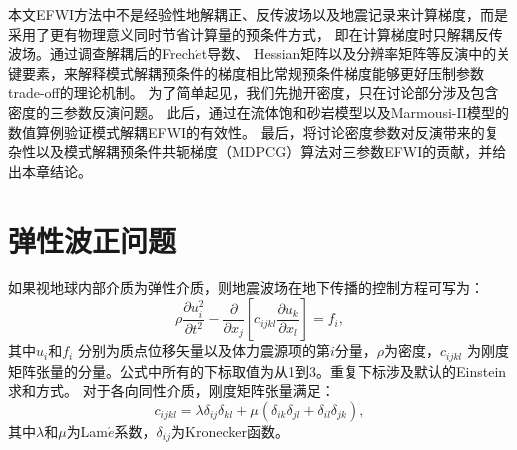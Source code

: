 本文EFWI方法中不是经验性地解耦正、反传波场以及地震记录\cite{ren.liu:2016}来计算梯度，而是采用了更有物理意义同时节省计算量的预条件方式，
即在计算梯度时只解耦反传波场。通过调查解耦后的Frech{$\acute{e}$}t导数、
Hessian矩阵以及分辨率矩阵等反演中的关键要素，来解释模式解耦预条件的梯度相比常规预条件梯度能够更好压制参数trade-off的理论机制。
为了简单起见，我们先抛开密度，只在讨论部分涉及包含密度的三参数反演问题。
此后，通过在流体饱和砂岩模型以及Marmousi-II模型的数值算例验证模式解耦EFWI的有效性。
最后，将讨论密度参数对反演带来的复杂性以及模式解耦预条件共轭梯度（MDPCG）算法对三参数EFWI的贡献，并给出本章结论。

\section{弹性波正问题}
\label{sec:forward_problem}
如果视地球内部介质为弹性介质，则地震波场在地下传播的控制方程可写为：
\begin{equation}
	\rho \frac{\partial u^2_i}{\partial t^2}  -
	\frac{\partial}{\partial x_j}\left[c_{ijkl}\frac{\partial u_{k}}{\partial
	x_l}\right]=f_i,
	\label{eq:WE} 
\end{equation}
其中$u_i$和$f_i$ 分别为质点位移矢量以及体力震源项的第$i$分量，$\rho$为密度，$c_{ijkl}$
为刚度矩阵张量的分量。公式中所有的下标取值为从1到3。重复下标涉及默认的Einstein求和方式。
对于各向同性介质，刚度矩阵张量满足：
\begin{equation}
	c_{ijkl}=\lambda\delta_{ij}\delta
	_{kl}+\mu(\delta_{ik}\delta _{jl}+\delta _{il}\delta_{jk}),
	\label{Lame}
\end{equation}
其中$\lambda$和$\mu$为Lam$\acute{e}$系数，$\delta_{ij}$为Kronecker函数。 

